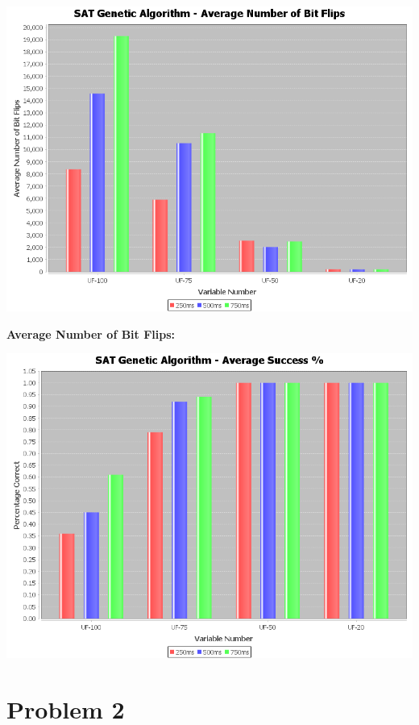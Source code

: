 \documentclass[10pt,a4paper]{article}
\begin{document}
	\begin{center}
		\includegraphics[scale=0.35]{average_bitflips}
	\end{center}
	
	\textbf{Average Number of Bit Flips:} 
	
	\begin{center}
		\includegraphics[scale=0.35]{average_success}
	\end{center}
	
	\section*{Problem 2}
	
\end{document}
